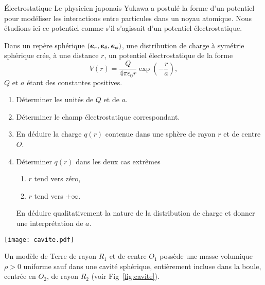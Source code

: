 \begin{td}{Électrostatique}
	Le physicien japonais Yukawa a postulé la forme d'un potentiel pour modéliser
	les interactions entre particules dans un noyau atomique. Nous étudions
	ici ce potentiel comme s'il s'agissait d'un potentiel électrostatique.

	Dans un repère sphérique $(\er, \etheta, \ephi)$, une distribution de 
	charge à symétrie sphérique crée, à une distance $r$,
	un potentiel électrostatique de la forme
	\begin{equation}
		V(r) = \dfrac{Q}{4 \pi \epsilon_0 r} \exp\left(-\dfrac{r}{a}\right),
	\end{equation}
	$Q$ et $a$ étant des constantes positives.

	\begin{enumerate}
		\item Déterminer les unités de $Q$ et de $a$.
		\item Déterminer le champ électrostatique correspondant.
		\item En déduire la charge $q(r)$ contenue dans une sphère de 
		  rayon $r$ et de centre $O$.
		\item Déterminer $q(r)$ dans les deux cas extrêmes
			\begin{enumerate}
				\item $r$ tend vers zéro,
				\item $r$ tend vers $+\infty$.
			\end{enumerate}
		 En déduire qualitativement la nature de la distribution de charge
		 et donner une interprétation de $a$.
 	\end{enumerate}


\begin{figure*}[h!]
\centering
\texttt{[image: cavite.pdf]}
\caption{Schéma de la sphère de masse volumique $\rho$ (en gris sur le schéma) 
	 et de la cavité vide (en blanc).
         À l'intérieur de la cavité, la masse volumique vaut 0.}
\label{fig:cavite}
\end{figure*}
Un modèle de Terre de rayon $R_1$ et de centre $O_1$ possède une masse volumique 
$\rho>0$ uniforme sauf dans une cavité sphérique, 
entièrement incluse dans la boule, centrée en $O_2$, de rayon $R_2$
(voir Fig~\ref{fig:cavite}). 


\end{td}
